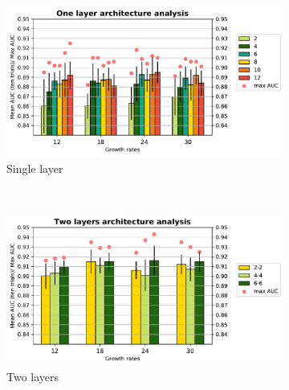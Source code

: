 \flushbottom
\newpage

\begin{figure}
    \centering
    \begin{subfigure}[b]{7cm}
        \includegraphics[width=\textwidth]{images/densenet/simple/densenet_simple_single_layer_bar}
        \caption{Single layer }
        \label{fig:densenet_simple_single_layer_bar}
    \end{subfigure}
    ~ %
    \begin{subfigure}[b]{7cm}
        \includegraphics[width=\textwidth]{images/densenet/simple/densenet_simple_double_layer_bar}
        \caption{Two layers}
       \label{fig:densenet_simple_double_layer_bar}
    \end{subfigure}    
    \quad
    \centering
    \begin{subfigure}[b]{7cm}

\end{subfigure}
\end{figure}
